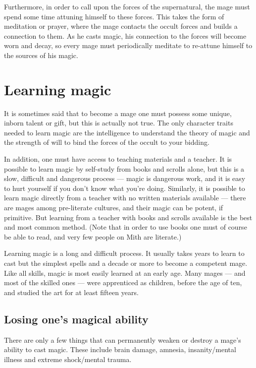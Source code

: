 Furthermore, in order to call upon the forces of the supernatural, the mage must spend some time attuning himself to these forces. This takes the form of meditation or prayer, where the mage contacts the occult forces and builds a connection to them. As he casts magic, his connection to the forces will become worn and decay, so every mage must periodically meditate to re-attune himself to the sources of his magic. 



\section{Learning magic}
It is sometimes said that to become a mage one must possess some unique, inborn talent or gift, but this is actually not true. The only character traits needed to learn magic are the intelligence to understand the theory of magic and the strength of will to bind the forces of the occult to your bidding. 

In addition, one must have access to teaching materials and a teacher. It is possible to learn magic by self-study from books and scrolls alone, but this is a slow, difficult and dangerous process --- magic is dangerous work, and it is easy to hurt yourself if you don't know what you're doing. Similarly, it is possible to learn magic directly from a teacher with no written materials available --- there are mages among pre-literate cultures, and their magic can be potent, if primitive. But learning from a teacher with books and scrolls available is the best and most common method. (Note that in order to use books one must of course be able to read, and very few people on Mith are literate.) 

Learning magic is a long and difficult process. It usually takes years to learn to cast but the simplest spells and a decade or more to become a competent mage. Like all skills, magic is most easily learned at an early age. Many mages --- and most of the skilled ones --- were apprenticed as children, before the age of ten, and studied the art for at least fifteen years. 

\subsection{Losing one's magical ability}
There are only a few things that can permanently weaken or destroy a mage's ability to cast magic. These include brain damage, amnesia, insanity/mental illness and extreme shock/mental trauma. 

